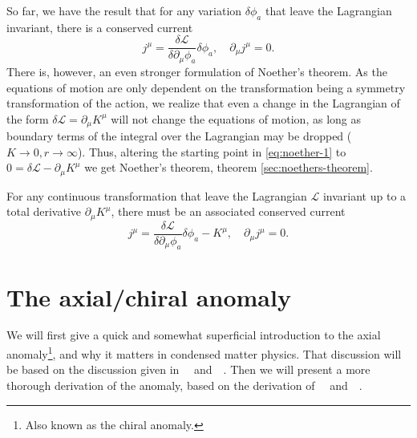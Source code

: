 So far, we have the result that for any variation $\delta \phi_a$ that leave the Lagrangian invariant, there is a conserved current
\begin{equation}
  j^{\mu} = \frac{\delta \mathcal{L}}{\delta \partial_{\mu}\phi_a} \delta\phi_a, \quad \partial_{\mu}j^{\mu} = 0.
\end{equation}
There is, however, an even stronger formulation of Noether's theorem.
As the equations of motion are only dependent on the transformation being a symmetry transformation of the action, we realize that even a change in the Lagrangian of the form $\delta \mathcal{L} = \partial_{\mu}K^{\mu}$ will not change the equations of motion, as long as boundary terms of the integral over the Lagrangian may be dropped ($K\to  0, r \to \infty$).
Thus, altering the starting point in \cref{eq:noether-1} to $0 = \delta \mathcal{L} - \partial_{\mu}K^{\mu}$ we get Noether's theorem, theorem \ref{sec:noethers-theorem}.
\begin{theorem}\label{sec:noethers-theorem}
  For any continuous transformation that leave the Lagrangian $\mathcal{L}$ invariant up to a total derivative $\partial _{\mu }K^{\mu }$, there must be an associated conserved current
  \begin{equation}
    \label{eq:noether_thm}
    j^{\mu} = \frac{\delta \mathcal{L}}{\delta \partial_{\mu} \phi_a} \delta \phi_a - K^{\mu}, \quad \partial_{\mu }j^{\mu } =0.
  \end{equation}
\end{theorem}


\section{The axial/chiral anomaly}
We will first give a quick and somewhat superficial introduction to the axial anomaly\footnote{Also known as the chiral anomaly.}, and why it matters in condensed matter physics.
That discussion will be based on the discussion given in~\citeauthor{wehlingDiracMaterials2014}~\cite{wehlingDiracMaterials2014} and~\citeauthor{tongGaugeTheoryLecture}~\cite[Ch.~3]{tongGaugeTheoryLecture}.
Then we will present a more thorough derivation of the anomaly, based on the derivation of~\citeauthor{zeeQuantumFieldTheory2010}~\cite{zeeQuantumFieldTheory2010} and~\citeauthor{kachelriessQuantumFieldsHubble2018}~\cite{kachelriessQuantumFieldsHubble2018}.


